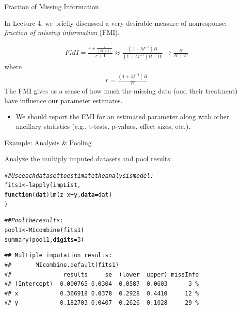 \documentclass{beamer}\usepackage[]{graphicx}\usepackage[]{color}
\makeatletter
\newcommand{\hlnum}[1]{\textcolor[rgb]{0.69,0.494,0}{#1}}%
\newcommand{\hlcom}[1]{\textcolor[rgb]{0.514,0.506,0.514}{\textit{#1}}}%
\newcommand{\hlopt}[1]{\textcolor[rgb]{0,0,0}{#1}}%
\newcommand{\hlstd}[1]{\textcolor[rgb]{0,0,0}{#1}}%
\newcommand{\hlkwa}[1]{\textcolor[rgb]{0,0,0}{\textbf{#1}}}%
\newcommand{\hlkwb}[1]{\textcolor[rgb]{0,0.341,0.682}{#1}}%
\newcommand{\hlkwc}[1]{\textcolor[rgb]{0,0,0}{\textbf{#1}}}%
\newcommand{\hlkwd}[1]{\textcolor[rgb]{0.004,0.004,0.506}{#1}}%
\newenvironment{kframe}{%
 \def\at@end@of@kframe{}%
 \ifinner\ifhmode%
  \def\at@end@of@kframe{\end{minipage}}%
  \begin{minipage}{\columnwidth}%
 \fi\fi%
 \def\FrameCommand##1{\hskip\@totalleftmargin \hskip-\fboxsep
 \colorbox{shadecolor}{##1}\hskip-\fboxsep
     \hskip-\linewidth \hskip-\@totalleftmargin \hskip\columnwidth}%
 \MakeFramed {\advance\hsize-\width
   \@totalleftmargin\z@ \linewidth\hsize
   \@setminipage}}%
 {\par\unskip\endMakeFramed%
 \at@end@of@kframe}
\newenvironment{knitrout}{}{} %
\makeatother
\begin{document}

\begin{frame}{Fraction of Missing Information}
  
  In Lecture 4, we briefly discussed a very desirable measure of nonresponse: 
  \emph{fraction of missing information} (FMI).
  
  \begin{align*}
    FMI = \frac{r + \frac{2}{(df + 3)}}{r + 1} \approx \frac{(1 + M^{-1})B}{(1 + M^{-1})B + W} \rightarrow \frac{B}{B + W}
  \end{align*}
  where
  \begin{align*}
    r = \frac{(1 + M^{-1})B}{W}
  \end{align*}
  The FMI gives us a sense of how much the missing data (and their treatment) 
  have influence our parameter estimates.
  \vc
  \begin{itemize}
  \item We should report the FMI for an estimated parameter along with other 
    ancillary statistics (e.g., t-tests, p-values, effect sizes, etc.).
  \end{itemize}
  
\end{frame}

\watermarkoff %

\begin{frame}[fragile]{Example: Analysis \& Pooling}
  
  Analyze the multiply imputed datasets and pool results:
  
\begin{knitrout}\footnotesize
{}\color{fgcolor}\begin{kframe}
\begin{alltt}
\hlcom{## Use each dataset to estimate the analysis model:}
\hlstd{fits1} \hlkwb{<-} \hlkwd{lapply}\hlstd{(impList,}
                \hlkwa{function}\hlstd{(}\hlkwc{dat}\hlstd{)} \hlkwd{lm}\hlstd{(z} \hlopt{~} \hlstd{x} \hlopt{+} \hlstd{y,} \hlkwc{data} \hlstd{= dat)}
                \hlstd{)}

\hlcom{## Pool the results:}
\hlstd{pool1} \hlkwb{<-} \hlkwd{MIcombine}\hlstd{(fits1)}
\hlkwd{summary}\hlstd{(pool1,} \hlkwc{digits} \hlstd{=} \hlnum{3}\hlstd{)}
\end{alltt}
\begin{verbatim}
## Multiple imputation results:
##       MIcombine.default(fits1)
##               results     se  (lower  upper) missInfo
## (Intercept)  0.000765 0.0304 -0.0587  0.0603      3 %
## x            0.366918 0.0378  0.2928  0.4410     12 %
## y           -0.182703 0.0407 -0.2626 -0.1028     29 %
\end{verbatim}
\end{kframe}
\end{knitrout}

\end{frame}
\end{document}

